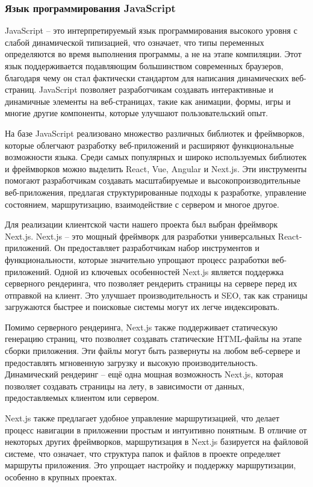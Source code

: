 \subsubsection{Язык программирования JavaScript}

JavaScript – это интерпретируемый язык программирования высокого уровня с слабой динамической типизацией, что означает, что типы переменных определяются во время выполнения программы, а не на этапе компиляции. Этот язык поддерживается подавляющим большинством современных браузеров, благодаря чему он стал фактически стандартом для написания динамических веб-страниц. JavaScript позволяет разработчикам создавать интерактивные и динамичные элементы на веб-страницах, такие как анимации, формы, игры и многие другие компоненты, которые улучшают пользовательский опыт.

На базе JavaScript реализовано множество различных библиотек и фреймворков, которые облегчают разработку веб-приложений и расширяют функциональные возможности языка. Среди самых популярных и широко используемых библиотек и фреймворков можно выделить React, Vue, Angular и Next.js. Эти инструменты помогают разработчикам создавать масштабируемые и высокопроизводительные веб-приложения, предлагая структурированные подходы к разработке, управление состоянием, маршрутизацию, взаимодействие с сервером и многое другое.

Для реализации клиентской части нашего проекта был выбран фреймворк Next.js. Next.js – это мощный фреймворк для разработки универсальных React-приложений. Он предоставляет разработчикам набор инструментов и функциональности, которые значительно упрощают процесс разработки веб-приложений. Одной из ключевых особенностей Next.js является поддержка серверного рендеринга, что позволяет рендерить страницы на сервере перед их отправкой на клиент. Это улучшает производительность и SEO, так как страницы загружаются быстрее и поисковые системы могут их легче индексировать.

Помимо серверного рендеринга, Next.js также поддерживает статическую генерацию страниц, что позволяет создавать статические HTML-файлы на этапе сборки приложения. Эти файлы могут быть развернуты на любом веб-сервере и предоставлять мгновенную загрузку и высокую производительность. Динамический рендеринг – ещё одна мощная возможность Next.js, которая позволяет создавать страницы на лету, в зависимости от данных, предоставляемых клиентом или сервером.

Next.js также предлагает удобное управление маршрутизацией, что делает процесс навигации в приложении простым и интуитивно понятным. В отличие от некоторых других фреймворков, маршрутизация в Next.js базируется на файловой системе, что означает, что структура папок и файлов в проекте определяет маршруты приложения. Это упрощает настройку и поддержку маршрутизации, особенно в крупных проектах.

